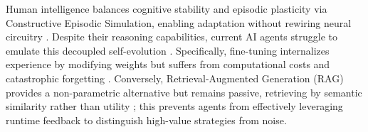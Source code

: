 \documentclass{article}
\theoremstyle{plain}
\theoremstyle{definition}
\theoremstyle{remark}
\begin{document}
Human intelligence balances cognitive stability and episodic plasticity \citep{grossberg2013adaptive,mcclelland1995there,kumaran2016learning} via Constructive Episodic Simulation, enabling adaptation without rewiring neural circuitry \citep{schacter2007constructive,hassabis2007deconstructing,schacter2012future,gick1980analogical}. Despite their reasoning capabilities, current AI agents struggle to emulate this decoupled self-evolution \citep{wei2022chain,yao2022react,schick2023toolformer,wang2023voyager}. Specifically, fine-tuning internalizes experience by modifying weights \citep{ouyang2022training,stiennon2020learning,rafailov2023direct,ethayarajh2024kto} but suffers from computational costs and catastrophic forgetting \citep{kirkpatrick2017overcoming,li2024revisiting,wu2024continuallearninglargelanguage}. Conversely, Retrieval-Augmented Generation (RAG) \citep{lewis2020retrieval} provides a non-parametric alternative but remains passive, retrieving by semantic similarity rather than utility \citep{karpukhin2020dense,gao2023retrieval}; this prevents agents from effectively leveraging runtime feedback to distinguish high-value strategies from noise.
\end{document}
